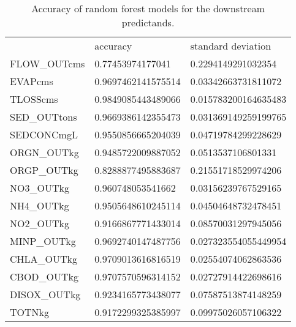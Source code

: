\begin{table}[h]
\caption{Accuracy of random forest models for the downstream predictands.}
\label{rf_accuracies}
\centering
\begin{tabular}{lll}
 & accuracy & standard deviation \\
FLOW\_OUTcms & 0.77453974177041 & 0.2294149291032354 \\
EVAPcms & 0.9697462141575514 & 0.03342663731811072 \\
TLOSScms & 0.9849085443489066 & 0.015783200164635483 \\
SED\_OUTtons & 0.9669386142355473 & 0.031369149259199765 \\
SEDCONCmgL & 0.9550856665204039 & 0.04719784299228629 \\
ORGN\_OUTkg & 0.9485722009887052 & 0.0513537106801331 \\
ORGP\_OUTkg & 0.8288877495883687 & 0.21551718529974206 \\
NO3\_OUTkg & 0.960748053541662 & 0.03156239767529165 \\
NH4\_OUTkg & 0.9505648610245114 & 0.04504648732478451 \\
NO2\_OUTkg & 0.9166867771433014 & 0.08570031297945056 \\
MINP\_OUTkg & 0.9692740147487756 & 0.027323554055449954 \\
CHLA\_OUTkg & 0.9709013616816519 & 0.02554074062863536 \\
CBOD\_OUTkg & 0.9707570596314152 & 0.02727914422698616 \\
DISOX\_OUTkg & 0.9234165773438077 & 0.07587513874148259 \\
TOTNkg & 0.9172299325385997 & 0.09975026057106322
\end{tabular}%
\end{table}
